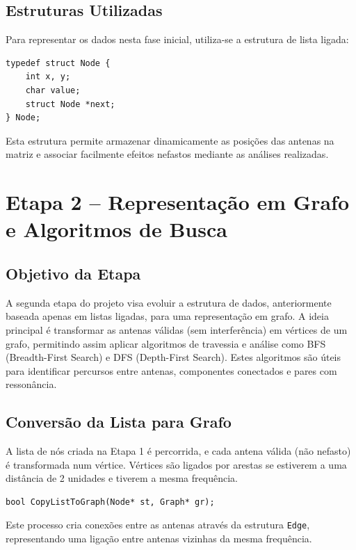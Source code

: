 \documentclass[a4paper,12pt]{article}
\begin{document}
\subsection{Estruturas Utilizadas}
Para representar os dados nesta fase inicial, utiliza-se a estrutura de lista ligada:

\begin{lstlisting}[style=CStyle]
typedef struct Node {
    int x, y;
    char value;
    struct Node *next;
} Node;
\end{lstlisting}

Esta estrutura permite armazenar dinamicamente as posições das antenas na matriz e associar facilmente efeitos nefastos mediante as análises realizadas.

\newpage


\section{Etapa 2 – Representação em Grafo e Algoritmos de Busca}

\subsection{Objetivo da Etapa}
A segunda etapa do projeto visa evoluir a estrutura de dados, anteriormente baseada apenas em listas ligadas, para uma representação em grafo. A ideia principal é transformar as antenas válidas (sem interferência) em vértices de um grafo, permitindo assim aplicar algoritmos de travessia e análise como BFS (Breadth-First Search) e DFS (Depth-First Search). Estes algoritmos são úteis para identificar percursos entre antenas, componentes conectados e pares com ressonância.

\subsection{Conversão da Lista para Grafo}
A lista de nós criada na Etapa 1 é percorrida, e cada antena válida (não nefasto) é transformada num vértice. Vértices são ligados por arestas se estiverem a uma distância de 2 unidades e tiverem a mesma frequência.

\begin{lstlisting}[style=CStyle]
bool CopyListToGraph(Node* st, Graph* gr);
\end{lstlisting}

Este processo cria conexões entre as antenas através da estrutura \texttt{Edge}, representando uma ligação entre antenas vizinhas da mesma frequência.
\end{document}
